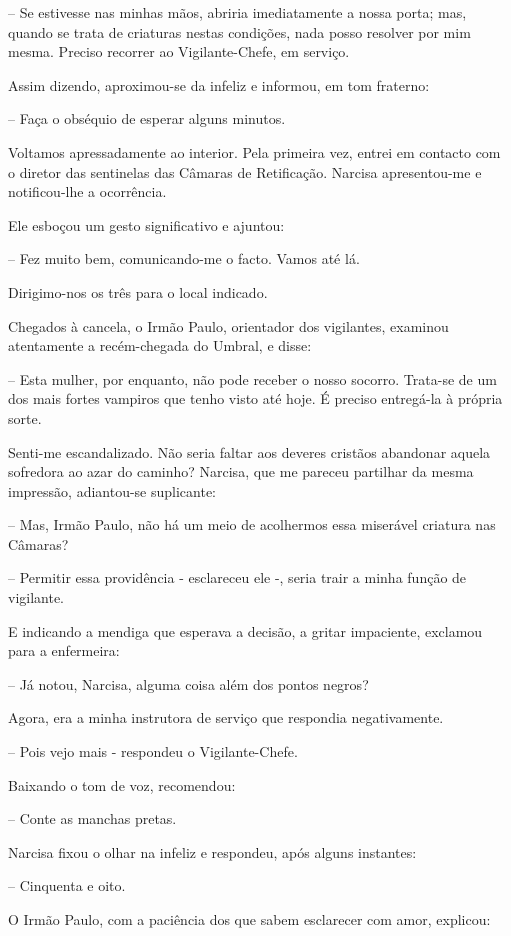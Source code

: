 \documentclass[portuguese,12pt,a4paper]{scrbook}
\begin{document}
	– Se estivesse nas minhas mãos, abriria imediatamente a nossa porta; mas, quando se trata de criaturas nestas condições, nada posso resolver por mim mesma. Preciso recorrer ao Vigilante-Chefe, em serviço.
	
	
	Assim dizendo, aproximou-se da infeliz e informou, em tom fraterno:
	
	– Faça o obséquio de esperar alguns minutos.
	
	Voltamos apressadamente ao interior. Pela primeira vez, entrei em contacto com o diretor das sentinelas das Câmaras de Retificação. Narcisa apresentou-me e notificou-lhe a ocorrência.
	
	Ele esboçou um gesto significativo e ajuntou:
	
	– Fez muito bem, comunicando-me o facto. Vamos até lá.
	
	Dirigimo-nos os três para o local indicado.
	
	Chegados à cancela, o Irmão Paulo, orientador dos vigilantes, examinou atentamente a recém-chegada do Umbral, e disse:
	
	– Esta mulher, por enquanto, não pode receber o nosso socorro. Trata-se de um dos mais fortes vampiros que tenho visto até hoje. É preciso entregá-la à própria sorte.
	
	Senti-me escandalizado. Não seria faltar aos deveres cristãos abandonar aquela sofredora ao azar do caminho? Narcisa, que me pareceu partilhar da mesma impressão, adiantou-se suplicante:
	
	– Mas, Irmão Paulo, não há um meio de acolhermos essa miserável criatura nas Câmaras?
	
	– Permitir essa providência - esclareceu ele -, seria trair a minha função de vigilante.
	
	E indicando a mendiga que esperava a decisão, a gritar impaciente, exclamou para a enfermeira:
	
	– Já notou, Narcisa, alguma coisa além dos pontos negros?
	
	Agora, era a minha instrutora de serviço que respondia negativamente.
	
	– Pois vejo mais - respondeu o Vigilante-Chefe.
	
	Baixando o tom de voz, recomendou:
	
	
	– Conte as manchas pretas.
	
	Narcisa fixou o olhar na infeliz e respondeu, após alguns instantes:
	
	– Cinquenta e oito.
	
	O Irmão Paulo, com a paciência dos que sabem esclarecer com amor, explicou:
	
\end{document}
